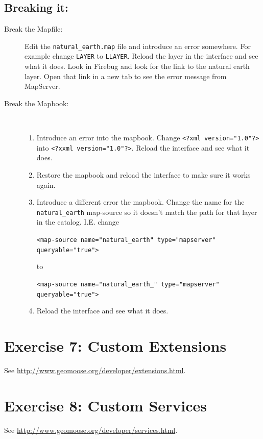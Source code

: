 \documentclass[letterpaper]{article}
\begin{document}
\subsection*{Breaking it:}
\begin{description}
\item[Break the Mapfile:] Edit the \verb'natural_earth.map' file
  and introduce an error somewhere.  For example change
  \verb'LAYER' to \verb'LLAYER'.  Reload the layer in the
  interface and see what it does.  Look in Firebug and look for
  the link to the natural earth layer.  Open that link in a new
  tab to see the error message from MapServer.
\item[Break the Mapbook:] \hfill \\
  \begin{enumerate}
  \item Introduce an error into the mapbook. Change
    \verb|<?xml version="1.0"?>| into
    \verb|<?xxml version="1.0"?>|.  Reload the interface and see
    what it does.
  \item Restore the mapbook and reload the interface to make
    sure it works again.
  \item Introduce a different error the mapbook.  Change the
    name for the \verb|natural_earth| map-source so it doesn't match
    the path for that layer in the catalog.  I.E. change

    \verb|<map-source name="natural_earth" type="mapserver" queryable="true">|

    to

    \verb|<map-source name="natural_earth_" type="mapserver" queryable="true">|
  \item Reload the interface and see what it does.
  \end{enumerate}
\end{description}

\section*{Exercise 7: Custom Extensions}
  See \url{http://www.geomoose.org/developer/extensions.html}.
\section*{Exercise 8: Custom Services}
  See \url{http://www.geomoose.org/developer/services.html}.
\end{document}
